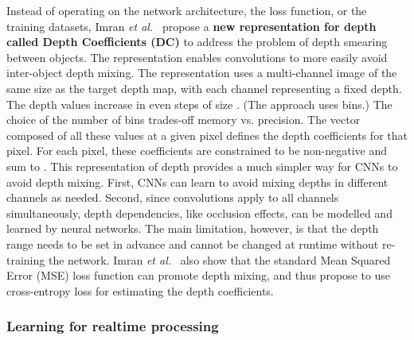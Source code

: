 \documentclass[10pt,journal,compsoc]{IEEEtran}
\newcommand{\etal}{\emph{et al.}}
\begin{document}
Instead of operating on the network architecture, the loss function, or the training datasets, Imran \etal~\cite{Imran_2019_CVPR }  propose a \textbf{new representation for depth called Depth Coefficients (DC)} to address the problem of depth smearing between objects.  The representation enables convolutions to more easily avoid inter-object depth mixing.  The representation uses a multi-channel image of the same size as the target depth map, with each channel representing a fixed depth. The depth values increase in even steps of size . (The approach uses  bins.) The choice of the number of bins  trades-off memory vs. precision.  The vector composed of all these values at a given pixel defines the depth coefficients for that pixel. For each pixel, these coefficients are constrained to be non-negative and sum to .   This representation of depth provides a much simpler way for CNNs to avoid  depth mixing.  First, CNNs can learn to avoid mixing depths in different channels as needed.   Second, since convolutions apply to all channels simultaneously, depth dependencies, like occlusion effects, can be modelled and learned by neural networks. The main limitation, however, is  that the depth range needs to be set in advance and cannot be changed at runtime without re-training the network.  Imran \etal~\cite{Imran_2019_CVPR }  also show that the standard Mean Squared Error (MSE) loss function can promote depth mixing, and thus propose to use cross-entropy loss for estimating the depth coefficients. 



\subsubsection{Learning for realtime processing}
\label{sec:realtime}
\end{document}
